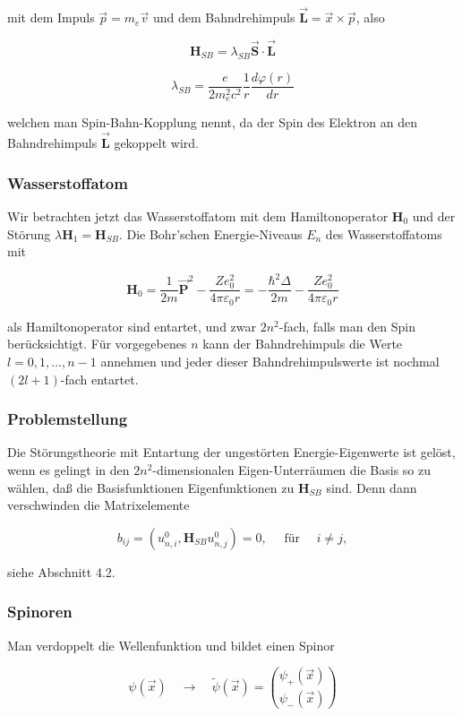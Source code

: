 \documentclass[10pt, letterpaper]{article}
\begin{document}
mit dem Impuls $\vec{p}=m_{e} \vec{v}$ und dem Bahndrehimpuls $\overrightarrow{\mathbf{L}}=\vec{x} \times \vec{p}$, also

$$
\mathbf{H}_{S B}=\lambda_{S B} \overrightarrow{\mathbf{S}} \cdot \overrightarrow{\mathbf{L}}
$$

$$
\lambda_{S B}=\frac{e}{2 m_{e}^{2} c^{2}} \frac{1}{r} \frac{d \varphi(r)}{d r}
$$

welchen man Spin-Bahn-Kopplung nennt, da der Spin des Elektron an den Bahndrehimpuls $\overrightarrow{\mathbf{L}}$ gekoppelt wird.

\subsubsection*{Wasserstoffatom}
Wir betrachten jetzt das Wasserstoffatom mit dem Hamiltonoperator $\mathbf{H}_{0}$ und der Störung $\lambda \mathbf{H}_{1}=\mathbf{H}_{S B}$. Die Bohr'schen Energie-Niveaus $E_{n}$ des Wasserstoffatoms mit

$$
\mathbf{H}_{0}=\frac{1}{2 m} \overrightarrow{\mathbf{P}}^{2}-\frac{Z e_{0}^{2}}{4 \pi \varepsilon_{0} r}=-\frac{\hbar^{2} \Delta}{2 m}-\frac{Z e_{0}^{2}}{4 \pi \varepsilon_{0} r}
$$

als Hamiltonoperator sind entartet, und zwar $2 n^{2}$-fach, falls man den Spin berücksichtigt. Für vorgegebenes $n$ kann der Bahndrehimpuls die Werte $l=0,1, \ldots, n-1$ annehmen und jeder dieser Bahndrehimpulswerte ist nochmal $(2 l+1)$-fach entartet.

\subsubsection*{Problemstellung}
Die Störungstheorie mit Entartung der ungestörten Energie-Eigenwerte ist gelöst, wenn es gelingt in den $2 n^{2}$-dimensionalen Eigen-Unterräumen die Basis so zu wählen, daß die Basisfunktionen Eigenfunktionen zu $\mathbf{H}_{S B}$ sind. Denn dann verschwinden die Matrixelemente

$$
b_{i j}=\left(u_{n, i}^{0}, \mathbf{H}_{S B} u_{n, j}^{0}\right)=0, \quad \text { für } \quad i \neq j,
$$

siehe Abschnitt 4.2.

\subsubsection*{Spinoren}
Man verdoppelt die Wellenfunktion und bildet einen Spinor

$$
\psi(\vec{x}) \quad \rightarrow \quad \tilde{\psi}(\vec{x})=\binom{\psi_{+}(\vec{x})}{\psi_{-}(\vec{x})}
$$
\end{document}
